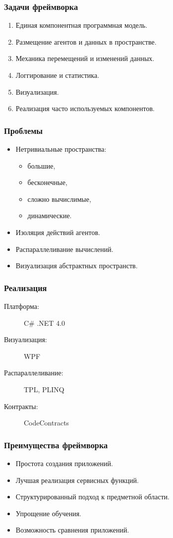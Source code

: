 \documentclass[14pt]{beamer}
\begin{document}
\begin{frame}
    \frametitle{Задачи фреймворка}
    \begin{enumerate}
        \item Единая компонентная программная модель.
        \item Размещение агентов и данных в пространстве.
        \item Механика перемещений и изменений данных.
        \item Логгирование и статистика.
        \item Визуализация.
        \item Реализация часто используемых компонентов.
    \end{enumerate}
\end{frame}

\begin{frame}
    \frametitle{Проблемы}
    \begin{itemize}[<+->]
        \item Нетривиальные пространства:
        \begin{itemize}[<.->]
            \item большие,
            \item бесконечные,
            \item сложно вычислимые,
            \item динамические.
        \end{itemize}
        \item Изоляция действий агентов.
        \item Распараллеливание вычислений.
        \item Визуализация абстрактных пространств.
    \end{itemize}
\end{frame}

\begin{frame}
    \frametitle{Реализация}
    \begin{description}
        \item[Платформа:] C\# .NET 4.0
        \item[Визуализация:] WPF
        \item[Распараллеливание:] TPL, PLINQ
        \item[Контракты:] CodeContracts
    \end{description}
\end{frame}

\begin{frame}
    \frametitle{Преимущества фреймворка}
    \begin{itemize}
        \item Простота создания приложений.
        \item Лучшая реализация сервисных функций.
        \item Структурированный подход к предметной области.
        \item Упрощение обучения.
        \item Возможность сравнения приложений.
    \end{itemize}
\end{frame}
\end{document}
